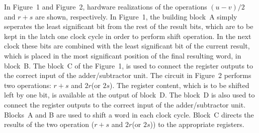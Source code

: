 \documentclass[twocolumn]{IEEEtran}
\begin{document}
In Figure~1 and Figure~2, hardware realizations of the operations $(u-v)/2$ 
and $r+s$ are shown, respectively. In Figure~1, the building block~A simply 
seperates the least significant bit from the rest of the result bits, which are 
to be kept in the latch one clock cycle in order to perform shift operation.
In the next clock these bits are combined with the least significant bit of 
the current result, which is placed in the most significant position of the 
final resulting word, in block~B. The block~C of the Figure~1, is used to 
connect the register outputs to the correct input of the adder/subtractor unit.
The circuit in Figure~2 performs 
two operations: $r+s$ and $2r$(or $2s$). The register content, which is to be
shifted left by one bit, is available at the output of block~D. The block~D
is also used to connect the register outputs to the correct input of the 
adder/subtractor unit. Blocks~A and B are used to shift a word in each 
clock cycle. Block~C directs the results of the two operation 
($r+s$ and $2r$(or $2s$)) to the appropriate registers. 

\bigskip
\bigskip



\end{document}
